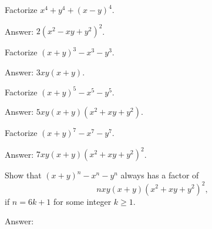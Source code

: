 \begin{tcolorbox}
\begin{question}
Factorize $x^4+y^4+(x-y)^4$.
\end{question}
\end{tcolorbox}

\begin{solution}
Answer: $2(x^2-xy+y^2)^2$.
\end{solution}



\begin{tcolorbox}
\begin{question}
Factorize $(x+y)^3 - x^3 - y^3$.
\end{question}
\end{tcolorbox}

\begin{solution}
Answer: $3xy(x+y)$.
\end{solution}


\begin{tcolorbox}
\begin{question}
Factorize $(x+y)^5 - x^5 - y^5$.
\end{question}
\end{tcolorbox}

\begin{solution}
Answer: $5xy(x+y)(x^2+xy+y^2)$.
\end{solution}


\begin{tcolorbox}
\begin{question}
Factorize $(x+y)^7 - x^7 - y^7$.
\end{question}
\end{tcolorbox}

\begin{solution}
Answer: $7xy(x+y)(x^2+xy+y^2)^2$.
\end{solution}


\begin{tcolorbox}
\begin{question}
Show that $(x+y)^n - x^n - y^n$ always has a factor of \[nxy(x+y)(x^2+xy+y^2)^2,\] if $n=6k+1$ for some integer $k\geq 1$.
\end{question}
\end{tcolorbox}

\begin{solution}
Answer: 
\end{solution}




